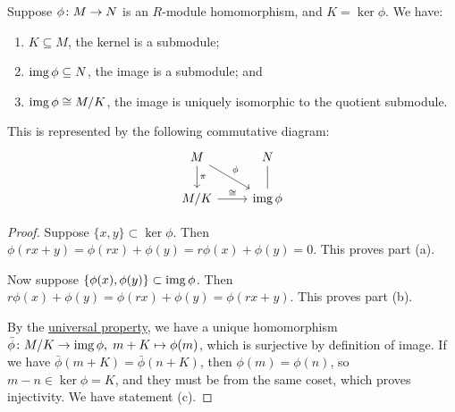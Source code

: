 \begin{theorem}\label{thm:iso-1-mod}
    Suppose \(\phi\colon M\to N\) is an \(R\)-module homomorphism,
    and \(K = \ker\phi\). We have:
    \begin{enumerate}[label={(\alph*)}, itemsep=0mm]
        \item \(K \subseteq M\), the kernel is a submodule;
        \item \(\operatorname{img}\phi \subseteq N\), the image is a submodule; and
        \item \(\operatorname{img}\phi \cong M/K\), the image is uniquely isomorphic to the quotient submodule.
    \end{enumerate}
    This is represented by the following commutative diagram:
    \begin{equation*}
        \begin{tikzcd}
            M \arrow{rd}{\phi} \arrow{d}{\pi} & N \\
            M/K \arrow{r}{\cong} & \img\phi \arrow[dash]{u}
        \end{tikzcd}
    \end{equation*}
\end{theorem}
\begin{proof}
    Suppose \(\{x,y\} \subset \ker\phi\).
    Then \(\phi(rx+y) = \phi(rx) + \phi(y) = r\phi(x) + \phi(y) = 0\).
    This proves part (a).

    \medskip

    Now suppose \(\{\phi(x),\phi(y)\} \subset \operatorname{img}\phi\).
    Then \(r\phi(x)+\phi(y) = \phi(rx)+\phi(y) = \phi(rx+y)\).
    This proves part (b).

    \medskip

    By the \hyperref[thm:univ-prop-quotient-mod]{universal property},
    we have a unique homomorphism \(\bar{\phi}\colon M/K\to\operatorname{img}\phi,\;m+K\mapsto\phi(m)\),
    which is surjective by definition of image.
    If we have \(\bar{\phi}(m+K) = \bar{\phi}(n+K)\),
    then \(\phi(m) = \phi(n)\),
    so \(m-n \in \ker\phi = K\),
    and they must be from the same coset,
    which proves injectivity.
    We have statement (c).
\end{proof}

